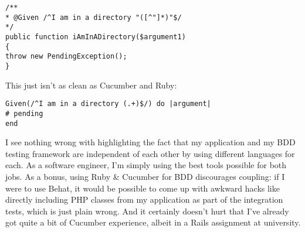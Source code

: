 \begin{minipage}{\textwidth}
\begin{lstlisting}
/**
* @Given /^I am in a directory "([^"]*)"$/
*/
public function iAmInADirectory($argument1)
{
throw new PendingException();
}
\end{lstlisting}
\end{minipage}

This just isn't as clean as Cucumber and Ruby:

\begin{minipage}{\textwidth}
\begin{lstlisting}
Given(/^I am in a directory (.+)$/) do |argument|
# pending
end
\end{lstlisting}
\end{minipage}

I see nothing wrong with highlighting the fact that my application and my BDD testing framework are independent of each other by using different languages for each. As a software engineer, I'm simply using the best tools possible for both jobs. As a bonus, using Ruby \& Cucumber for BDD discourages coupling: if I were to use Behat, it would be possible to come up with awkward hacks like directly including PHP classes from my application as part of the integration tests, which is just plain wrong. And it certainly doesn't hurt that I've already got quite a bit of Cucumber experience, albeit in a Rails assignment at university.